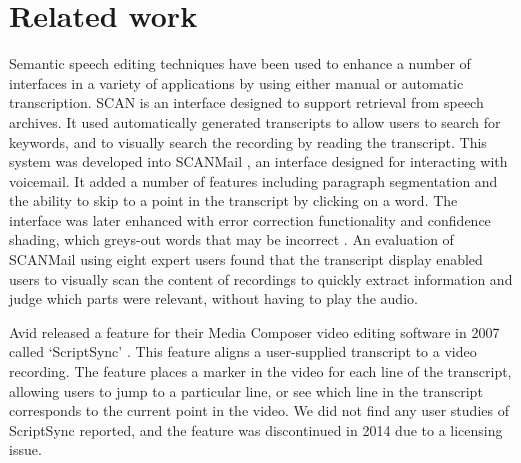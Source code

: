 
\section{Related work}\label{sec:relatedwork}


Semantic speech editing techniques have been used to enhance a number of
interfaces in a variety of applications by using either manual or
automatic transcription.
SCAN \citep{Whittaker1999} is an interface designed to support retrieval from
speech archives. It used automatically generated transcripts to allow users to
search for keywords, and to visually search the recording by reading the
transcript. This system was developed into SCANMail \citep{Whittaker2002}, an
interface designed for interacting with voicemail. It added a number of
features including paragraph segmentation and the ability to skip to a point in
the transcript by clicking on a word. The interface was later enhanced with
error correction functionality and confidence shading, which greys-out words
that may be incorrect \citep{Burke2006}. An evaluation of SCANMail using eight
expert users found that the transcript display enabled users to visually scan
the content of recordings to quickly extract information and judge which
parts were relevant, without having to play the audio.

Avid released a feature for their Media Composer video editing software in 2007
called `ScriptSync' \citep{Avid2011}. This feature aligns a user-supplied
transcript to a video recording. The feature places a marker in the video for
each line of the transcript, allowing users to jump to a particular line, or
see which line in the transcript corresponds to the current point in the video.
We did not find any user studies of ScriptSync reported, and the feature was
discontinued in 2014 due to a licensing issue.

